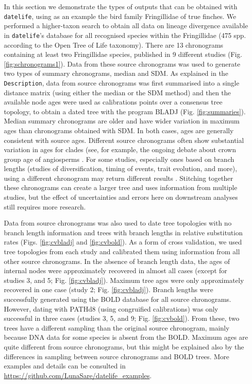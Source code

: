 \documentclass[11pt,]{article}
\begin{document}
In this section we demonstrate the types of outputs that can be obtained
with \texttt{datelife}, using as an example the bird family Fringillidae
of true finches. We performed a higher-taxon search to obtain all data
on lineage divergence available in \texttt{datelife}'s database for all
recognised species within the Fringillidae (475 spp. according to the
Open Tree of Life taxonomy). There are 13 chronograms containing at
least two Fringillidae species, published in 9 different studies (Fig.
\ref{fig:schronograms1}). Data from these source chronograms was used to
generate two types of summary chronograms, median and SDM. As explained
in the \texttt{Description}, data from source chronograms was first
summarised into a single distance matrix (using either the median or the
SDM method) and then the available node ages were used as calibrations
points over a consensus tree topology, to obtain a dated tree with the
program BLADJ (Fig. \ref{fig:summaries}). Median summary chronograms are
older and have wider variation in maximum ages than chronograms obtained
with SDM. In both cases, ages are generally consistent with source ages.
Different source chronograms often show substantial variation in ages
for clades (see, for example, the ongoing debate about crown group age
of angiosperms
\citep{barba2018constraining, magallon2015metacalibrated, sanderson2001sources, ramshaw1972time}.
For some studies, especially ones based on branch lengths (studies of
diversification, timing of events, trait evolution, and more), using a
different chronogram may return different results
\citep{title2016macrophylogenies}. Stitching together these chronograms
can create a larger tree and uses information from multiple studies, but
the effect of uncertainties and errors here on downstream analyses still
requires more research.

Data from source chronograms was also used to date tree topologies with
no branch length information and trees with branch lengths in relative
substitution rates (Figs. \ref{fig:cvbladj} and \ref{fig:cvbold}). As a
form of cross validation, we used tree topologies from each study and
calibrated them using information from all other source chronograms. In
the absence of branch length data, the ages of internal nodes were
approximately recovered in almost all cases (except for studies 3, and
5; Fig. \ref{fig:cvbladj}). Maximum tree ages were only approximately
recovered in one case (study 2; Fig. \ref{fig:cvbladj}). Branch lengths
were successfully generated using the BOLD database for all source
chronograms. However, dating with PATHd8 (using congruified
calibrations) was only successful in three cases (studies 3, 5, and 9;
Fig. \ref{fig:cvbold}). From these, two trees have a different sampling
than the original source chronogram, mainly because DNA data for some
species is absent from the BOLD. Maximum ages are quite different from
source chronograms, but this might be explained also by the differences
in sampling between source chronograms and BOLD trees. More examples and
details can be consulted in
\url{https://github.com/LunaSare/datelife_examples}.
\end{document}
